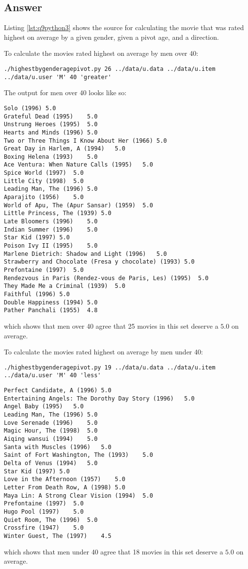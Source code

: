 \documentclass[letterpaper,11pt]{article}
\begin{document}
\newpage
\subsection*{Answer}

Listing \ref{lst:q9python3} shows the source for calculating the movie that was rated highest on average by a given gender, given a pivot age, and a direction.

To calculate the movies rated highest on average by men over 40:
\begin{lstlisting}[frame=single]
./highestbygenderagepivot.py 26 ../data/u.data ../data/u.item ../data/u.user 'M' 40 'greater'
\end{lstlisting}

The output for men over 40 looks like so:
\begin{lstlisting}
Solo (1996)	5.0
Grateful Dead (1995)	5.0
Unstrung Heroes (1995)	5.0
Hearts and Minds (1996)	5.0
Two or Three Things I Know About Her (1966)	5.0
Great Day in Harlem, A (1994)	5.0
Boxing Helena (1993)	5.0
Ace Ventura: When Nature Calls (1995)	5.0
Spice World (1997)	5.0
Little City (1998)	5.0
Leading Man, The (1996)	5.0
Aparajito (1956)	5.0
World of Apu, The (Apur Sansar) (1959)	5.0
Little Princess, The (1939)	5.0
Late Bloomers (1996)	5.0
Indian Summer (1996)	5.0
Star Kid (1997)	5.0
Poison Ivy II (1995)	5.0
Marlene Dietrich: Shadow and Light (1996) 	5.0
Strawberry and Chocolate (Fresa y chocolate) (1993)	5.0
Prefontaine (1997)	5.0
Rendezvous in Paris (Rendez-vous de Paris, Les) (1995)	5.0
They Made Me a Criminal (1939)	5.0
Faithful (1996)	5.0
Double Happiness (1994)	5.0
Pather Panchali (1955)	4.8
\end{lstlisting}
which shows that men over 40 agree that 25 movies in this set deserve a $5.0$ on average.

To calculate the movies rated highest on average by men under 40:
\begin{lstlisting}[frame=single]
./highestbygenderagepivot.py 19 ../data/u.data ../data/u.item ../data/u.user 'M' 40 'less'
\end{lstlisting}

\begin{lstlisting}[frame=single]
Perfect Candidate, A (1996)	5.0
Entertaining Angels: The Dorothy Day Story (1996)	5.0
Angel Baby (1995)	5.0
Leading Man, The (1996)	5.0
Love Serenade (1996)	5.0
Magic Hour, The (1998)	5.0
Aiqing wansui (1994)	5.0
Santa with Muscles (1996)	5.0
Saint of Fort Washington, The (1993)	5.0
Delta of Venus (1994)	5.0
Star Kid (1997)	5.0
Love in the Afternoon (1957)	5.0
Letter From Death Row, A (1998)	5.0
Maya Lin: A Strong Clear Vision (1994)	5.0
Prefontaine (1997)	5.0
Hugo Pool (1997)	5.0
Quiet Room, The (1996)	5.0
Crossfire (1947)	5.0
Winter Guest, The (1997)	4.5
\end{lstlisting}
which shows that men under 40 agree that 18 movies in this set deserve a $5.0$ on average.
\end{document}
